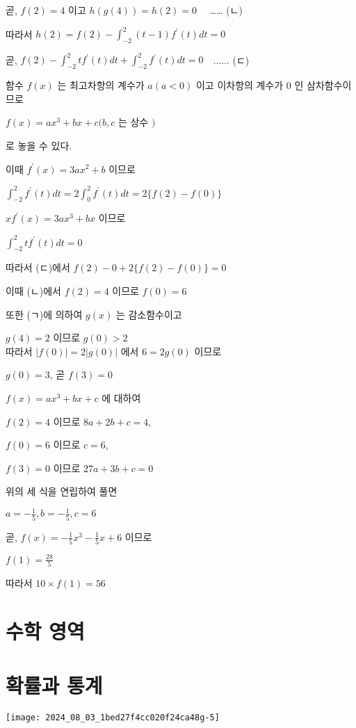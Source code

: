 \documentclass[10pt]{article}
\begin{document}
곧, \(f(2)=4\) 이고 \(h(g(4))=h(2)=0 \quad\) …… (ㄴ)

따라서 \(h(2)=f(2)-\int_{-2}^{2}(t-1) f^{\prime}(t) d t=0\)

곧, \(f(2)-\int_{-2}^{2} t f^{\prime}(t) d t+\int_{-2}^{2} f^{\prime}(t) d t=0 \quad\)...... (ㄷ)

함수 \(f(x)\) 는 최고차항의 계수가 \(a(a<0)\) 이고 이차항의 계수가 0 인 삼차함수이므로

\(f(x)=a x^{3}+b x+c(b, c\) 는 상수 \()\)

로 놓을 수 있다.

이때 \(f^{\prime}(x)=3 a x^{2}+b\) 이므로

\(\int_{-2}^{2} f^{\prime}(t) d t=2 \int_{0}^{2} f^{\prime}(t) d t=2\{f(2)-f(0)\}\)

\(x f^{\prime}(x)=3 a x^{3}+b x\) 이므로

\(\int_{-2}^{2} t f^{\prime}(t) d t=0\)

따라서 (ㄷ)에서 \(f(2)-0+2\{f(2)-f(0)\}=0\)

이때 (ㄴ)에서 \(f(2)=4\) 이므로 \(f(0)=6\)

또한 (ㄱ)에 의하여 \(g(x)\) 는 감소함수이고

\(g(4)=2\) 이므로 \(g(0)>2\)\\
따라서 \(|f(0)|=2|g(0)|\) 에서 \(6=2 g(0)\) 이므로

\(g(0)=3\), 곧 \(f(3)=0\)

\(f(x)=a x^{3}+b x+c\) 에 대하여

\(f(2)=4\) 이므로 \(8 a+2 b+c=4\),

\(f(0)=6\) 이므로 \(c=6\),

\(f(3)=0\) 이므로 \(27 a+3 b+c=0\)

위의 세 식을 연립하여 풀면

\(a=-\frac{1}{5}, b=-\frac{1}{5}, c=6\)

곧, \(f(x)=-\frac{1}{5} x^{3}-\frac{1}{5} x+6\) 이므로

\(f(1)=\frac{28}{5}\)

따라서 \(10 \times f(1)=56\)

\section*{수학 영역}
\section*{확률과 통계}
\begin{center}
\texttt{[image: 2024\_08\_03\_1bed27f4cc020f24ca48g-5]}
\end{center}
\end{document}
